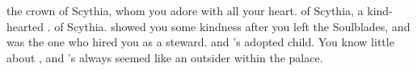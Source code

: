 \documentclass[char]{Kos}
\begin{document}
\begin{contacts}
\contact{\cBride{}} the crown \cBride{\prince} of Scythia, whom you adore with all your heart.
\contact{\cScythiaKing{}} \cScythiaKing{\Monarch} of Scythia, a kind-hearted \cScythiaKing{\human}.
\contact{\cScythiaQueen{}} \cScythiaQueen{\Monarch} of Scythia. \cScythiaQueen{\They} showed you some kindness after you left the Soulblades, and was the one who hired you as a steward.
\contact{\cWard{}} \cScythiaKing{} and \cScythiaQueen{}'s adopted child. You know little about \cWard{\them}, and \cWard{\they}'s always seemed like an outsider within the palace.
\end{contacts} 
\end{document}
